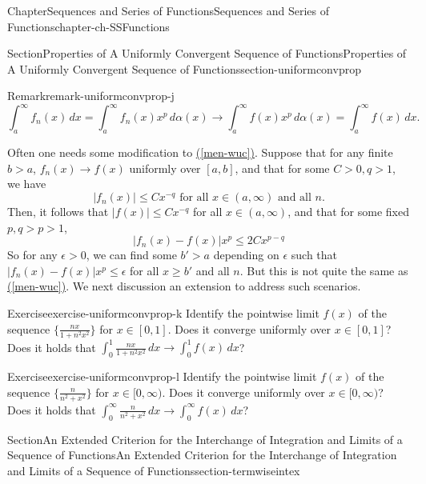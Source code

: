 \documentclass[oneside,10pt,]{book}
\newcommand{\xreffont}{\relax}
\numberwithin{equation}{section}
\newcommand{\gt}{>}
\begin{document}
\begin{chapterptx}{Chapter}{Sequences and Series of Functions}{}{Sequences and Series of Functions}{}{}{chapter-ch-SSFunctions}
\begin{sectionptx}{Section}{Properties of A Uniformly Convergent Sequence of Functions}{}{Properties of A Uniformly Convergent Sequence of Functions}{}{}{section-uniformconvprop}
\begin{remark}{Remark}{}{remark-uniformconvprop-j}
\begin{equation*}
\int_a^{\infty}f_n(x)\, dx= \int_a^{\infty}f_n(x)x^p\, d\alpha(x)\to
\int_a^{\infty}f(x)x^p\, d\alpha(x)=\int_a^{\infty}f(x)\, dx.
\end{equation*}
%
\par
Often one needs some modification to \hyperref[men-wuc]{({\xreffont\ref{men-wuc}})}. Suppose that for any finite \(b \gt a\), \(f_n(x)\to f(x)\) uniformly over \([a, b]\), and that for some \(C\gt 0, q\gt 1\), we have%
\begin{equation*}
\vert f_n(x)\vert \le C x^{-q} \text{ for all $x\in (a, \infty)$ and all $n$.}
\end{equation*}
Then, it follows that \(\vert f(x)\vert \le C x^{-q}\) for all \(x\in (a, \infty)\), and that for some fixed \(p, q\gt p \gt 1\),%
\begin{equation*}
\vert f_n(x)-f(x)\vert  x^p\le 2C x^{p-q}
\end{equation*}
So for any \(\epsilon \gt 0\), we can find some \(b'\gt a\) depending on \(\epsilon\) such that \(\vert f_n(x)-f(x)\vert x^p \le \epsilon\) for all \(x\ge b'\) and all \(n\). But this is not quite the same as \hyperref[men-wuc]{({\xreffont\ref{men-wuc}})}. We next discussion an extension to address such scenarios.%
\end{remark}
\begin{inlineexercise}{Exercise}{}{exercise-uniformconvprop-k}%
Identify the pointwise limit \(f(x)\) of  the sequence \(\{ \frac{nx}{1+n^{2}x^{2}}\}   \) for \(x\in [0, 1]\). Does it converge uniformly over \(x\in [0, 1]\)? Does it holds that \(\int_{0}^{1}         \frac{nx}{1+n^{2}x^{2}} \, dx \to \int_{0}^{1} f(x)\, dx\)?%
\end{inlineexercise}%
\begin{inlineexercise}{Exercise}{}{exercise-uniformconvprop-l}%
Identify the pointwise limit \(f(x)\) of  the sequence \(\{ \frac{n}{n^{2}+x^{2}}\}\) for \(x\in [0, \infty)\).  Does it converge uniformly over \(x\in [0, \infty)\)? Does it holds that \(\int_{0}^{\infty }\frac{n}{n^{2}+x^{2}}\, dx \to 
\int_{0}^{\infty } f(x)\, dx\)?%
\end{inlineexercise}%
\end{sectionptx}
%
%
\typeout{************************************************}
\typeout{************************************************}
%
\begin{sectionptx}{Section}{An Extended Criterion for the Interchange of Integration and Limits  of a Sequence of Functions}{}{An Extended Criterion for the Interchange of Integration and Limits  of a Sequence of Functions}{}{}{section-termwiseintex}

\end{sectionptx}
\end{chapterptx}
\end{document}
